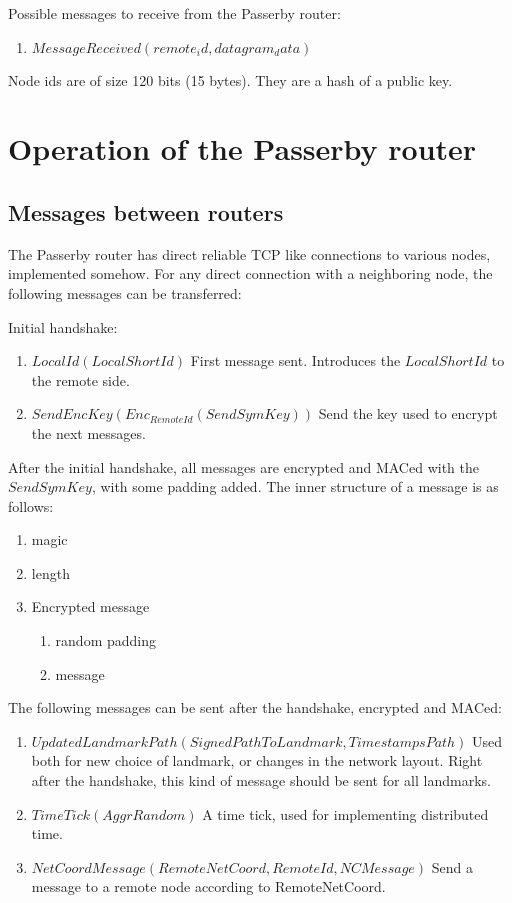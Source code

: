 \documentclass{amsart}
\theoremstyle{definition}
\theoremstyle{remark}
\numberwithin{equation}{section}
\begin{document}
Possible messages to receive from the Passerby router:
\begin{enumerate}
  \item $MessageReceived (remote_id, datagram_data)$
\end{enumerate}

Node ids are of size 120 bits (15 bytes). They are a hash of a public key.

\section{Operation of the Passerby router}

\subsection{Messages between routers}

The Passerby router has direct reliable TCP like connections to various nodes,
implemented somehow. For any direct connection with a neighboring node, the
following messages can be transferred:

Initial handshake:
\begin{enumerate}
  \item $LocalId(LocalShortId)$
      First message sent. Introduces the $LocalShortId$ to the remote side.
  \item $SendEncKey(Enc_{RemoteId}(SendSymKey))$
      Send the key used to encrypt the next messages.
\end{enumerate}

After the initial handshake, all messages are encrypted and MACed with the
$SendSymKey$, with some padding added. The inner structure of a message is as
follows:

\begin{enumerate}
  \item magic
  \item length
  \item Encrypted message
    \begin{enumerate}
      \item random padding
      \item message
    \end{enumerate}
\end{enumerate}

The following messages can be sent after the handshake, encrypted and MACed:

\begin{enumerate}
  \item $UpdatedLandmarkPath(SignedPathToLandmark, TimestampsPath)$
      Used both for new choice of landmark, or changes in the network layout.
      Right after the handshake, this kind of message should be sent for all
      landmarks.
  \item $TimeTick(AggrRandom)$
      A time tick, used for implementing distributed time.
  \item $NetCoordMessage(RemoteNetCoord, RemoteId, NCMessage)$
    Send a message to a remote node according to RemoteNetCoord.
\end{enumerate}
\end{document}
